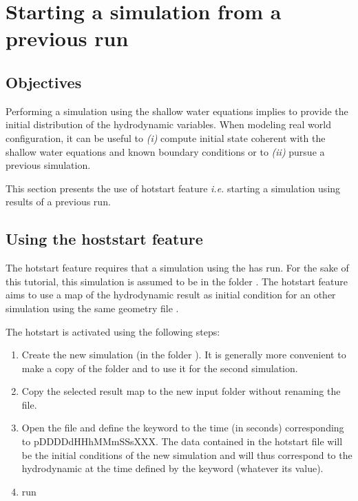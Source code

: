 \section{Starting a simulation from a previous run}
\subsection*{Objectives}
Performing a simulation using the shallow water equations implies to provide the initial distribution of the hydrodynamic variables. When modeling real world configuration, it can be useful to \emph{(i)} compute initial state coherent with the shallow water equations and known boundary conditions or to \emph{(ii)} pursue a previous simulation.

This section presents the use of hotstart feature \emph{i.e.} starting a simulation using results of a previous run.

\subsection*{Using the hoststart feature}
The hotstart feature requires that a simulation using the \swSolver has run. For the sake of this tutorial, this simulation is assumed to be in the folder . The hotstart feature aims to use a map of the hydrodynamic result  as initial condition for an other simulation using the same geometry file .

The hotstart is activated using the following steps:
\begin{enumerate}
\item Create the new simulation (in the folder ). It is generally more convenient to make a copy of the folder  and to use it for the second simulation.
\item Copy the selected result map  to the new input folder  without renaming the file.
\item Open the file  and define the keyword  to the time (in seconds) corresponding to pDDDDdHHhMMmSSsXXX. The data contained in the hotstart file will be the initial conditions of the new simulation and will thus correspond to the hydrodynamic at the time defined by the keyword  (whatever its value).
\item run \swSolver
\end{enumerate}